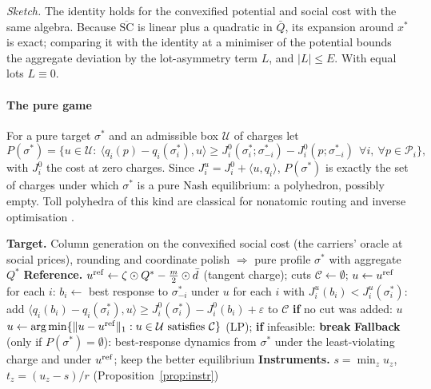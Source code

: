 \documentclass[preprint,12pt]{elsarticle}
\theoremstyle{definition}
\theoremstyle{remark}
\newcommand{\ip}[2]{\langle #1,#2\rangle}
\begin{document}
\emph{Sketch.} The identity holds for the convexified potential and social cost with the same algebra. Because $\overline{\mathrm{SC}}$ is linear plus a quadratic in $\bar Q$, its expansion around $x^*$ is exact; comparing it with the identity at a minimiser of the potential bounds the aggregate deviation by the lot-asymmetry term $L$, and $|L|\le E$. With equal lots $L\equiv0$.

\paragraph{The pure game} For a pure target $\sigma^*$ and an admissible box $\mathcal U$ of charges let
\[
P(\sigma^*)=\big\{u\in\mathcal U:\ \ip{q_i(p)-q_i(\sigma^*_i)}{u}\ge J^0_i(\sigma^*_i;\sigma^*_{-i})-J^0_i(p;\sigma^*_{-i})\ \ \forall i,\ \forall p\in\mathcal P_i\big\},
\]
with $J^0_i$ the cost at zero charges. Since $J^u_i=J^0_i+\ip{u}{q_i}$, $P(\sigma^*)$ is exactly the set of charges under which $\sigma^*$ is a pure Nash equilibrium: a polyhedron, possibly empty. Toll polyhedra of this kind are classical for nonatomic routing \citep{Bergendorff1997,Hearn1998} and inverse optimisation \citep{Ahuja2001}.

\begin{algorithm}[t]
\caption{DIP: dual implementation pricing}\label{alg:dip}
\begin{algorithmic}[1]
\State \textbf{Target.} Column generation on the convexified social cost (the carriers' oracle at social prices), rounding and coordinate polish $\Rightarrow$ pure profile $\sigma^*$ with aggregate $Q^*$
\State \textbf{Reference.} $u^{\rm ref}\gets\zeta\odot Q^*-\tfrac m2\odot\bar d$ (tangent charge); cuts $\mathcal C\gets\emptyset$; $u\gets u^{\rm ref}$
\Repeat
  \State for each $i$: $b_i\gets$ best response to $\sigma^*_{-i}$ under $u$ 
  \State for each $i$ with $J^u_i(b_i)<J^u_i(\sigma^*_i)$: add $\ip{q_i(b_i)-q_i(\sigma^*_i)}{u}\ge J^0_i(\sigma^*_i)-J^0_i(b_i)+\varepsilon$ to $\mathcal C$
  \State \textbf{if} no cut was added: \Return $u$ 
  \State $u\gets\arg\min\{\|u-u^{\rm ref}\|_1:u\in\mathcal U\text{ satisfies }\mathcal C\}$ (LP); \textbf{if} infeasible: \textbf{break}
\Until{}
\State \textbf{Fallback} (only if $P(\sigma^*)=\emptyset$): best-response dynamics from $\sigma^*$ under the least-violating charge and under $u^{\rm ref}$; keep the better equilibrium
\State \textbf{Instruments.} $s=\min_zu_z$, $t_z=(u_z-s)/r$ (Proposition~\ref{prop:instr})
\end{algorithmic}
\end{algorithm}
\end{document}
